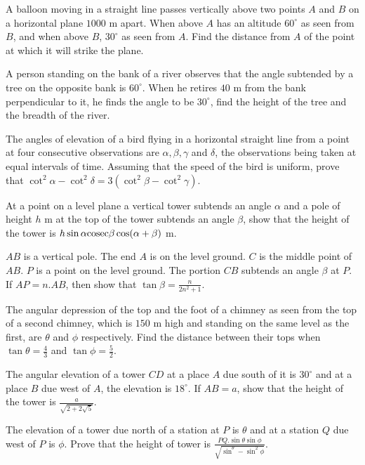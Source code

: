 \item A balloon moving in a straight line passes vertically above two points $A$ and $B$ on a horizontal plane
  $1000$ m apart. When above $A$ has an altitude $60^\circ$ as seen from $B$, and when above $B$,
  $30^\circ$ as seen from $A$. Find the distance from $A$ of the point at which it will strike the plane.

\item A person standing on the bank of a river observes that the angle subtended by a tree on the opposite bank is
  $60^\circ$. When he retires $40$ m from the bank perpendicular to it, he finds the angle to be $30^\circ$,
  find the height of the tree and the breadth of the river.

\item The angles of elevation of a bird flying in a horizontal straight line from a point at four consecutive observations are
  $\alpha, \beta, \gamma$ and $\delta$, the observations being taken at equal intervals of time. Assuming that the
  speed of the bird is uniform, prove that $\cot^2\alpha - \cot^2\delta = 3(\cot^2\beta - \cot^2\gamma)$.

\item At a point on a level plane a vertical tower subtends an angle $\alpha$ and a pole of height $h$ m at the top of
  the tower subtends an angle $\beta$, show that the height of the tower is $h\sin\alpha\rm cosec\beta\cos(\alpha +
  \beta)$ m.

\item $AB$ is a vertical pole. The end $A$ is on the level ground. $C$ is the middle point of
  $AB$. $P$ is a point on the level ground. The portion $CB$ subtends an angle $\beta$ at $P$. If
  $AP = n.AB$, then show that $\tan\beta = \frac{n}{2n^2 + 1}$.

\item The angular depression of the top and the foot of a chimney as seen from the top of a second chimney, which is $150$ m
  high and standing on the same level as the first, are $\theta$ and $\phi$ respectively. Find the distance between
  their tops when $\tan\theta = \frac{4}{3}$ and $\tan\phi = \frac{5}{2}.$

\item The angular elevation of a tower $CD$ at a place $A$ due south of it is $30^\circ$ and at a place $B$
  due west of $A$, the elevation is $18^\circ$. If $AB = a$, show that the height of the tower is
  $\frac{a}{\sqrt{2 + 2\sqrt{5}}}$.

\item The elevation of a tower due north of a station at $P$ is $\theta$ and at a station $Q$ due west of $P$
  is $\phi$. Prove that the height of tower is $\frac{PQ.\sin\theta\sin\phi}{\sqrt{\sin^\theta - \sin^2\phi}}$.

